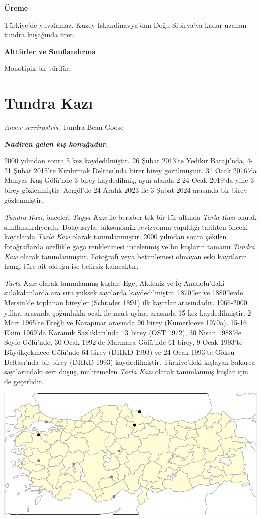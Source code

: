 \documentclass[
  letterpaper,
  DIV=11,
  numbers=noendperiod]{scrreprt}
\begin{document}
\textbf{Üreme}

Türkiye'de yuvalamaz. Kuzey İskandinavya'dan Doğu Sibirya'ya kadar
uzanan tundra kuşağında ürer.

\textbf{Alttürler ve Sınıflandırma}

Monotipik bir türdür.

\section{Tundra Kazı}\label{tundra-kazux131}

\emph{Anser serrirostris}, Tundra Bean Goose

\textbf{\emph{Nadiren gelen kış konuğudur.}}

2000 yılından sonra 5 kez kaydedilmiştir. 26 Şubat 2013'te Yedikır
Barajı'nda, 4-21 Şubat 2015'te Kızılırmak Deltası'nda birer birey
görülmüştür. 31 Ocak 2016'da Manyas Kuş Gölü'nde 3 birey kaydedilmiş,
aynı alanda 2-24 Ocak 2019'da yine 3 birey gözlenmiştir. Acıgöl'de 24
Aralık 2023 ile 3 Şubat 2024 arasında bir birey gözlenmiştir.

\emph{Tundra Kazı}, önceleri \emph{Tayga Kazı} ile beraber tek bir tür
altında \emph{Tarla Kazı} olarak sınıflandırılıyordu. Dolayısıyla,
taksonomik revizyonun yapıldığı tarihten önceki kayıtlarda \emph{Tarla
Kazı} olarak tanımlanmıştır. 2000 yılından sonra çekilen fotoğraflarda
özellikle gaga renklenmesi incelenmiş ve bu kuşların tamamı \emph{Tundra
Kazı} olarak tanımlanmıştır. Fotoğrafı veya betimlemesi olmayan eski
kayıtların hangi türe ait olduğu ise belirsiz kalacaktır.

\emph{Tarla Kazı} olarak tanımlanmış kuşlar, Ege, Akdeniz ve İç
Anadolu'daki sulakalanlarda ara sıra yüksek sayılarda kaydedilmiştir.
1870'ler ve 1880'lerde Mersin'de toplanan bireyler (Schrader 1891) ilk
kayıtlar arasındadır. 1966-2000 yılları arasında çoğunlukla ocak ile
mart ayları arasında 15 kez kaydedilmiştir. 2 Mart 1965'te Ereğli ve
Karapınar arasında 90 birey (Kumerloeve 1970a), 15-16 Ekim 1969'da
Karamık Sazlıkları'nda 13 birey (OST 1972), 30 Nisan 1988'de Seyfe
Gölü'nde, 30 Ocak 1992'de Marmara Gölü'nde 61 birey, 9 Ocak 1993'te
Büyükçekmece Gölü'nde 64 birey (DHKD 1993) ve 24 Ocak 1993'te Göksu
Deltası'nda bir birey (DHKD 1993) kaydedilmiştir. Türkiye'deki kışlayan
Sakarca sayılarındaki sert düşüş, muhtemelen \emph{Tarla Kazı} olarak
tanımlanmış kuşlar için de geçerlidir.

\includegraphics[width=6.25in,height=\textheight]{images/harita_Anser_serrirostris.png}
\end{document}
